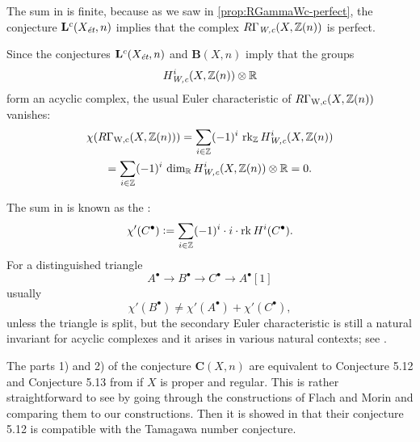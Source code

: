\begin{remark}
  \label{remark:secondary-euler-characteristic}
  The sum in  is finite, because as we
  saw in \ref{prop:RGammaWc-perfect}, the conjecture
  $\mathbf{L}^c (X_\text{\it ét}, n)$ implies that the complex
  $R\Gamma_\text{\it W,c} (X,\mathbb{Z}(n))$ is perfect.

  Since the conjectures $\mathbf{L}^c (X_\text{\it ét}, n)$ and
  $\mathbf{B} (X,n)$ imply that the groups
  $$H^i_\text{\it W,c} (X, \mathbb{Z} (n)) \otimes \mathbb{R}$$
  form an acyclic complex, the usual Euler characteristic of
  $R\Gamma_\text{W,c} (X, \mathbb{Z} (n))$ vanishes:
  \begin{multline*}
    \chi (R\Gamma_\text{W,c} (X, \mathbb{Z} (n))) =
    \sum_{i\in\mathbb{Z}} (-1)^i \, \operatorname{rk}_{\mathbb{Z}} H^i_\text{\it W,c} (X, \mathbb{Z} (n)) \\
    = \sum_{i\in\mathbb{Z}} (-1)^i \, \dim_{\mathbb{R}} H^i_\text{\it W,c} (X, \mathbb{Z} (n))\otimes \mathbb{R} = 0.
  \end{multline*}

  The sum in  is known as the
  :
  \[ \chi' (C^\bullet) \mathrel{\mathop:}=
    \sum_{i\in\mathbb{Z}} (-1)^i\cdot i\cdot \operatorname{rk} H^i (C^\bullet). \]
  For a distinguished triangle
  $$A^\bullet \to B^\bullet \to C^\bullet \to A^\bullet [1]$$
  usually
  $$\chi' (B^\bullet) \ne \chi' (A^\bullet) + \chi' (C^\bullet),$$
  unless the triangle is split, but the secondary Euler characteristic is still
  a natural invariant for acyclic complexes and it arises in various natural
  contexts; see \cite{Ramachandran-2016}.
\end{remark}

\begin{remark}
  \label{rmk:my-conjecture-and-FM}
  The parts 1) and 2) of the conjecture $\mathbf{C} (X,n)$ are equivalent to
  Conjecture 5.12 and Conjecture 5.13 from \cite{Flach-Morin-16} if $X$ is
  proper and regular. This is rather straightforward to see by going through the
  constructions of Flach and Morin and comparing them to our constructions. Then
  it is showed in \cite[\S 5.6]{Flach-Morin-16} that their conjecture 5.12 is
  compatible with the Tamagawa number conjecture.
\end{remark}

